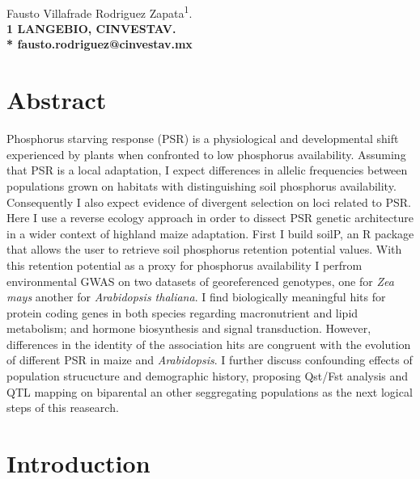 \documentclass[10pt,letterpaper]{article}
\begin{document}
\vspace*{0.35in}

\begin{flushleft}
{\Large
\textbf{}
}
\newline
\\
Fausto Villafrade Rodriguez Zapata\textsuperscript{1}.
\\
\bigskip
\bf{1} LANGEBIO, CINVESTAV.
\\
\bigskip
* fausto.rodriguez@cinvestav.mx

\end{flushleft}

\section*{Abstract}
Phosphorus starving response (PSR) is a physiological and developmental shift experienced by plants when confronted to low phosphorus availability. Assuming that PSR is a local adaptation, I expect differences in allelic frequencies between populations grown on habitats with distinguishing soil phosphorus availability. Consequently I also expect evidence of divergent selection on loci related to PSR. Here I use a reverse ecology approach in order to dissect PSR genetic architecture in a wider context of highland maize adaptation. First I build soilP, an R package that allows the user to retrieve soil phosphorus retention potential values. With this retention potential as a proxy for phosphorus availability I perfrom environmental GWAS on two datasets of georeferenced genotypes, one for \textit{Zea mays} another for \textit{Arabidopsis thaliana}. I find biologically meaningful hits for protein coding genes in both species regarding  macronutrient and lipid metabolism; and hormone biosynthesis and signal transduction. However, differences in the identity of the association hits are congruent with the evolution of different PSR in maize and \textit{Arabidopsis}. I further discuss confounding effects of population strucucture and demographic history, proposing Qst/Fst analysis  and QTL mapping on biparental an other seggregating populations as the next logical steps of this reasearch.


\linenumbers

\section*{Introduction}
\end{document}
